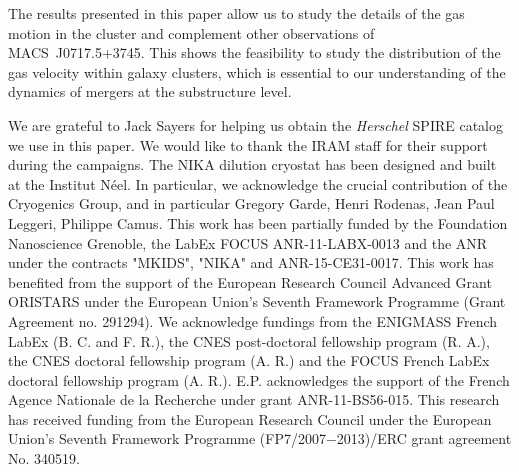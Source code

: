 \documentclass[twocolumn,traditabstract]{aa}
\begin{document}
The results presented in this paper allow us to study the details of the gas motion in the cluster and complement other observations of \mbox{MACS~J0717.5+3745}. This shows the feasibility to study the distribution of the gas velocity within galaxy clusters, which is essential to our understanding of the dynamics of mergers at the substructure level.

\begin{acknowledgements}
We are grateful to Jack Sayers for helping us obtain the \textit{Herschel} SPIRE catalog we use in this paper.
We would like to thank the IRAM staff for their support during the campaigns. 
The NIKA dilution cryostat has been designed and built at the Institut N\'eel. In particular, we acknowledge the crucial contribution of the Cryogenics Group, and in particular Gregory Garde, Henri Rodenas, Jean Paul Leggeri, Philippe Camus. 
This work has been partially funded by the Foundation Nanoscience Grenoble, the LabEx FOCUS ANR-11-LABX-0013 and the ANR under the contracts "MKIDS", "NIKA" and ANR-15-CE31-0017. 
This work has benefited from the support of the European Research Council Advanced Grant ORISTARS under the European Union's Seventh Framework Programme (Grant Agreement no. 291294).
We acknowledge fundings from the ENIGMASS French LabEx (B. C. and F. R.), the CNES post-doctoral fellowship program (R. A.), the CNES doctoral fellowship program (A. R.) and the FOCUS French LabEx doctoral fellowship program (A. R.).
E.P. acknowledges the support of the French Agence Nationale de la Recherche under grant ANR-11-BS56-015.
This research has received funding from the European Research Council under the European Union’s Seventh Framework Programme (FP7/2007−2013)/ERC grant agreement No. 340519.
\end{acknowledgements}


\end{document}
